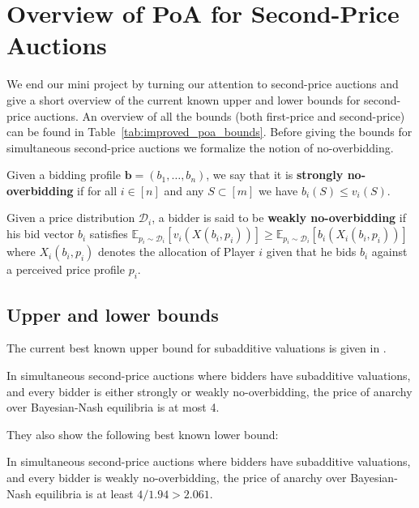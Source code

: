 \section{Overview of PoA for Second-Price Auctions} %
\label{sec:Overview of PoA for Second-Price Auctions}
We end our mini project by turning our attention to second-price auctions and give a short overview of the current known upper and lower bounds for second-price auctions. An overview of all the bounds (both first-price and second-price) can be found in Table~\ref{tab:improved_poa_bounds}. Before giving the bounds for simultaneous second-price auctions we formalize the notion of no-overbidding.
\begin{definition}
  Given a bidding profile $ \mathbf{b}=(b_1, \ldots, b_n) $, we say that it is \textbf{strongly no-overbidding} if for all $ i \in [n] $ and any $ S \subset [m] $ we have $ b_i(S) \leq v_i(S) $.
\end{definition}
\begin{definition}
  Given a price distribution $ \mathcal{D}_i $, a bidder is said to be \textbf{weakly no-overbidding} if his bid vector $ b_i $ satisfies $ \mathbb{E}_{p_i \sim \mathcal{D}_i}[v_i(X(b_i, p_i))] \geq \mathbb{E}_{p_i \sim \mathcal{D}_i}[b_i(X_i(b_i, p_i))] $ where $ X_i(b_i, p_i) $ denotes the allocation of Player $ i $ given that he bids $ b_i $ against a perceived price profile $ p_i $.
\end{definition}
\subsection{Upper and lower bounds} %
\label{sub:Upper}
The current best known upper bound for subadditive valuations is given in \cite{10.1145/2488608.2488634}.
\begin{theorem}[\cite{10.1145/2488608.2488634}]
  In simultaneous second-price auctions where bidders have subadditive valuations, and every bidder is either strongly or weakly no-overbidding, the price of anarchy over Bayesian-Nash equilibria is at most 4.
\end{theorem}
They also show the following best known lower bound:
\begin{theorem}[\cite{10.1145/2488608.2488634}]
  In simultaneous second-price auctions where bidders have subadditive valuations, and every bidder is weakly no-overbidding, the price of anarchy over Bayesian-Nash equilibria is at least $ 4 /1.94 > 2.061 $.
\end{theorem}

